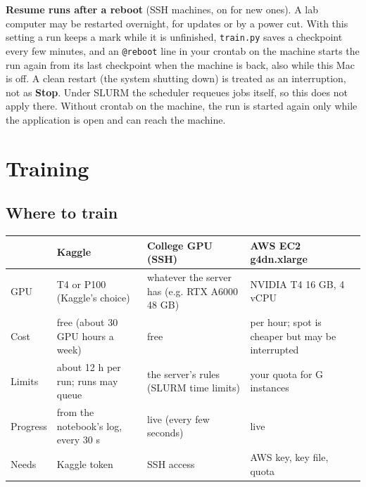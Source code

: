 \documentclass[11pt,a4paper]{article}
\newcommand{\ui}[1]{\textbf{\textsf{#1}}}
\newcommand{\file}[1]{\texttt{#1}}
\begin{document}
\textbf{Resume runs after a reboot} (SSH machines, on for new ones). A lab computer may be restarted overnight, for updates or by a
power cut. With this setting a run keeps a mark while it is unfinished, \file{train.py} saves a checkpoint every few minutes, and an
\texttt{@reboot} line in your crontab on the machine starts the run again from its last checkpoint when the machine is back, also while
this Mac is off. A clean restart (the system shutting down) is treated as an interruption, not as \ui{Stop}. Under SLURM the scheduler
requeues jobs itself, so this does not apply there. Without crontab on the machine, the run is started again only while the application
is open and can reach the machine.

\section{Training}
\label{sec:train}

\subsection{Where to train}
\begin{center}
\begin{tabularx}{\linewidth}{@{}lXXX@{}}
\toprule
 & \textbf{Kaggle} & \textbf{College GPU (SSH)} & \textbf{AWS EC2 g4dn.xlarge}\\
\midrule
GPU & T4 or P100 (Kaggle's choice) & whatever the server has (e.g. RTX A6000 48 GB) & NVIDIA T4 16 GB, 4 vCPU\\
Cost & free (about 30 GPU hours a week) & free & per hour; spot is cheaper but may be interrupted\\
Limits & about 12 h per run; runs may queue & the server's rules (SLURM time limits) & your quota for G instances\\
Progress & from the notebook's log, every 30 s & live (every few seconds) & live\\
Needs & Kaggle token & SSH access & AWS key, key file, quota\\
\bottomrule
\end{tabularx}
\end{center}
\end{document}
